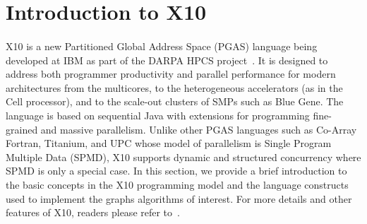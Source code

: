 \section{Introduction to X10}
\paragraph{}X10 is a new Partitioned Global Address Space (PGAS) language being developed at IBM as part of the DARPA HPCS project~\cite{X10-OOPSLA05}. It is designed to address both programmer productivity and parallel performance for modern architectures from the multicores, to the heterogeneous accelerators (as in the Cell processor), and to the scale-out clusters of SMPs such as Blue Gene.  The language is based on sequential Java with extensions for programming fine-grained and massive parallelism. Unlike other PGAS languages such as Co-Array Fortran, Titanium, and UPC whose model of parallelism is Single Program Multiple Data (SPMD), X10 supports dynamic and structured concurrency where SPMD is only a special case. In this section, we provide a brief introduction to the basic concepts in the X10 programming model and the language constructs used to implement the graphs algorithms of interest. For more details and other features of X10, readers please refer to~\cite{X10-OOPSLA05}.
 
